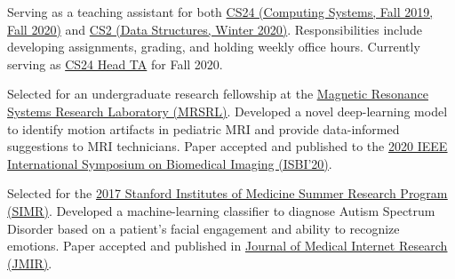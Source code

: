 \documentclass[]{deedy-resume-openfont}
\begin{document}
\begin{minipage}[t]{0.66\textwidth}

\begin{tightemize}
\item Serving as a teaching assistant for both \uline{CS24  (Computing Systems, Fall 2019, Fall 2020)} and \uline{CS2  (Data Structures, Winter 2020)}. Responsibilities include developing assignments, grading, and holding weekly office hours. Currently serving as \uline{CS24 Head TA} for Fall 2020. \end{tightemize}
\sectionsep


\begin{tightemize}\item Selected for an undergraduate research fellowship at the \href{https://mrsrl.sites.stanford.edu/}{\uline{Magnetic Resonance Systems Research Laboratory (MRSRL)}}. Developed a novel deep-learning model to identify motion artifacts in pediatric MRI and provide data-informed suggestions to MRI technicians. Paper accepted and published to the \href{http://2020.biomedicalimaging.org/}{\uline{2020 IEEE International Symposium on Biomedical Imaging (ISBI’20)}}.
\end{tightemize}
\sectionsep


\begin{tightemize}
\item Selected for the \href{https://simr.stanford.edu/}{\uline{2017 Stanford Institutes of Medicine Summer Research Program (SIMR)}}. Developed a machine-learning classifier to diagnose Autism Spectrum Disorder based on a patient’s facial engagement and ability to recognize emotions. Paper accepted and published in \href{https://www.jmir.org/2020/4/e13810/}{\uline{Journal of Medical Internet Research (JMIR)}}.\end{tightemize}
\sectionsep



\end{minipage}
\end{document}
